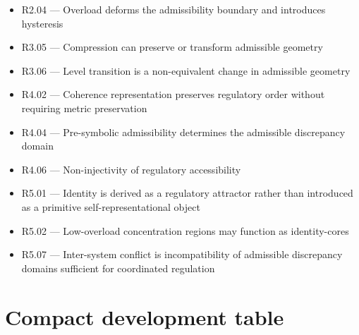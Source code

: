 \documentclass[12pt]{article}
\begin{document}
	\begin{itemize}[leftmargin=2em]
		\item R2.04 --- Overload deforms the admissibility boundary and introduces hysteresis
		\item R3.05 --- Compression can preserve or transform admissible geometry
		\item R3.06 --- Level transition is a non-equivalent change in admissible geometry
		\item R4.02 --- Coherence representation preserves regulatory order without requiring metric preservation
		\item R4.04 --- Pre-symbolic admissibility determines the admissible discrepancy domain
		\item R4.06 --- Non-injectivity of regulatory accessibility
		\item R5.01 --- Identity is derived as a regulatory attractor rather than introduced as a primitive self-representational object
		\item R5.02 --- Low-overload concentration regions may function as identity-cores
		\item R5.07 --- Inter-system conflict is incompatibility of admissible discrepancy domains sufficient for coordinated regulation
	\end{itemize}
	
	\section{Compact development table}
	
\end{document}

